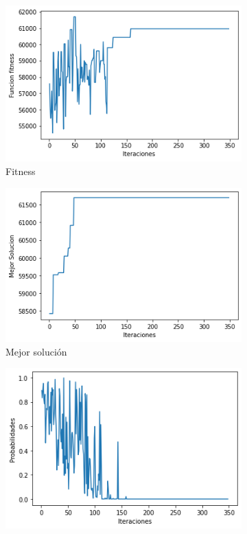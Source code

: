 \documentclass[a4paper,12pt]{article}
\begin{document}
	\begin{figure}[H]
		\centering
		\begin{subfigure}{0.24\textwidth}
			\centering
			\includegraphics[width=\textwidth]{include/L2/fitness.png}
			\caption{Fitness}
		\end{subfigure}
		\hfill
		\begin{subfigure}{0.24\textwidth}
			\centering
			\includegraphics[width=\textwidth]{include/L2/mejor_solucion.png}
			\caption{Mejor solución}
		\end{subfigure}
		\hfill
		\begin{subfigure}{0.24\textwidth}
			\centering
			\includegraphics[width=\textwidth]{include/L2/probabilidades.png}

\end{subfigure}
\end{figure}
\end{document}
